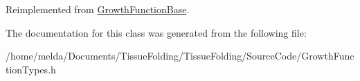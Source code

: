 Reimplemented from \hyperlink{classGrowthFunctionBase}{Growth\+Function\+Base}.



The documentation for this class was generated from the following file\+:\begin{DoxyCompactItemize}
\item 
/home/melda/\+Documents/\+Tissue\+Folding/\+Tissue\+Folding/\+Source\+Code/Growth\+Function\+Types.\+h\end{DoxyCompactItemize}
